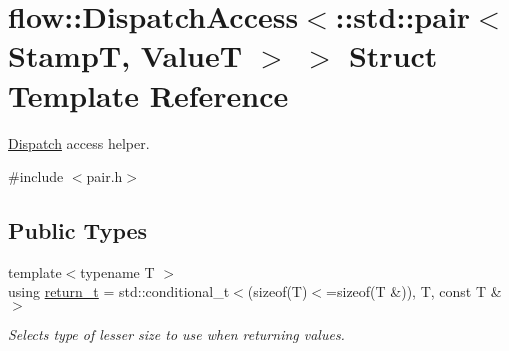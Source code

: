 \hypertarget{structflow_1_1_dispatch_access_3_1_1std_1_1pair_3_01_stamp_t_00_01_value_t_01_4_01_4}{}\section{flow\+:\+:Dispatch\+Access$<$\+:\+:std\+:\+:pair$<$ StampT, ValueT $>$ $>$ Struct Template Reference}
\label{structflow_1_1_dispatch_access_3_1_1std_1_1pair_3_01_stamp_t_00_01_value_t_01_4_01_4}


\hyperlink{classflow_1_1_dispatch}{Dispatch} access helper.  




{\ttfamily \#include $<$pair.\+h$>$}

\subsection*{Public Types}
\begin{DoxyCompactItemize}
\item 
\mbox{\label{structflow_1_1_dispatch_access_3_1_1std_1_1pair_3_01_stamp_t_00_01_value_t_01_4_01_4_a4d69ceeba753574e80855ee3dc1ffbb4}} 
{\footnotesize template$<$typename T $>$ }\\using \hyperlink{structflow_1_1_dispatch_access_3_1_1std_1_1pair_3_01_stamp_t_00_01_value_t_01_4_01_4_a4d69ceeba753574e80855ee3dc1ffbb4}{return\+\_\+t} = std\+::conditional\+\_\+t$<$(sizeof(T)$<$=sizeof(T \&)), T, const T \& $>$
\begin{DoxyCompactList}\small\item\em Selects type of lesser size to use when returning values. \end{DoxyCompactList}\end{DoxyCompactItemize}
